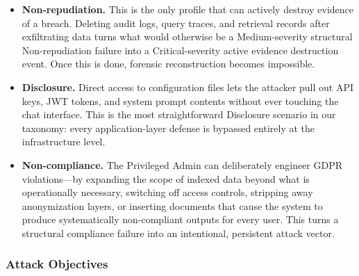 \begin{prosebox}
\begin{itemize}[leftmargin=1.4em, itemsep=5pt]
  \item \textbf{Non-repudiation.} This is the only profile that can
        actively destroy evidence of a breach. Deleting audit logs, query
        traces, and retrieval records after exfiltrating data turns what
        would otherwise be a Medium-severity structural Non-repudiation
        failure into a Critical-severity active evidence destruction event.
        Once this is done, forensic reconstruction becomes impossible.

  \item \textbf{Disclosure.} Direct access to configuration files lets the
        attacker pull out API keys, JWT tokens, and system prompt contents
        without ever touching the chat interface. This is the most
        straightforward Disclosure scenario in our taxonomy: every
        application-layer defense is bypassed entirely at the infrastructure
        level.

  \item \textbf{Non-compliance.} The Privileged Admin can deliberately
        engineer GDPR violations---by expanding the scope of indexed data
        beyond what is operationally necessary, switching off access controls,
        stripping away anonymization layers, or inserting documents that cause
        the system to produce systematically non-compliant outputs for every
        user. This turns a structural compliance failure into an intentional,
        persistent attack vector.
\end{itemize}
\end{prosebox}

\subsubsection{Attack Objectives}

